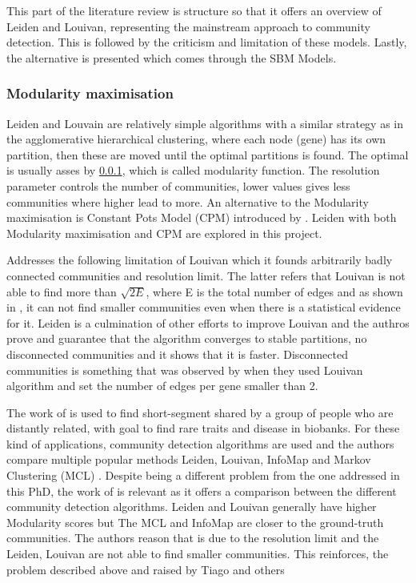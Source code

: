 This part of the literature review is structure so that it offers an overview of Leiden and Louivan, representing the mainstream approach to community detection. This is followed by the criticism and limitation of these models. Lastly, the alternative is presented which comes through the SBM Models.


\subsubsection{Modularity maximisation}

Leiden and Louvain \citet{Traag2019-ne,Blondel2008-ik} are relatively simple algorithms with a similar strategy as in the agglomerative hierarchical clustering, where each node (gene) has its own partition, then these are moved until the optimal partitions is found. The optimal is usually asses by \ref{}, which is called modularity function. The resolution parameter controls the number of communities, lower values gives less communities where higher lead to more. An alternative to the Modularity maximisation is Constant Pots Model (CPM) introduced by \citet{Traag2011-if}. Leiden with both Modularity maximisation and CPM are explored in this project.

Addresses the following limitation of Louivan which it founds arbitrarily badly connected communities and resolution limit. The latter refers that Louivan is not able to find more than $\sqrt{2E}$, where E is the total number of edges and as shown in \citet{Peixoto2021-jx}, it can not find smaller communities even when there is a statistical evidence for it. Leiden is a culmination of other efforts to improve Louivan\cite{Ozaki2016-dl,Waltman2013-zw,Bae2017-rz, Traag2015-tq} and the authros prove and guarantee that the algorithm converges to stable partitions, no disconnected communities and it shows that it is faster. Disconnected communities is something that was observed by \citet{Care2019-ij} when they used Louivan algorithm and set the number of edges per gene smaller than 2.

The work of \citet{Shemirani2023-ww} is used to find short-segment shared by a group of people who are distantly related, with goal to find rare traits and disease in biobanks. For these kind of applications, community detection algorithms are used and the authors compare multiple popular methods Leiden, Louivan, InfoMap \citet{Rosvall2008-kw} and Markov Clustering (MCL) \citet{Van_Dongen2008-yj}. Despite being a different problem from the one addressed in this PhD, the work of \citet{Shemirani2023-ww} is relevant as it offers a comparison between the different community detection algorithms. Leiden and Louivan generally have higher Modularity scores but The MCL and InfoMap are closer to the ground-truth communities. The authors reason that is due to the resolution limit and the Leiden, Louivan are not able to find smaller communities. This reinforces, the problem described above and raised by Tiago \citet{Peixoto2021-jx} and others \cite{Fortunato2007-gh, Traag2019-ne}

